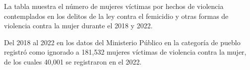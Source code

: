 La tabla muestra el número de mujeres víctimas por hechos de violencia contemplados en los delitos de la ley contra el femicidio y otras formas de violencia contra la mujer durante el 2018 y 2022. 

Del 2018 al 2022 en los datos del Ministerio Público en la categoría de pueblo registró como ignorado a 181,532 mujeres víctimas de violencia contra la mujer, de los cuales 40,001 se registraron en el 2022. 